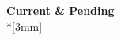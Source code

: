 \renewcommand{\LeftFooter}{Current \& Pending}
\renewcommand{\PageLimit}{0}
\setcounter{section}{0}

\begin{center}
{\bf Current \& Pending} \\*[3mm]
\end{center}

